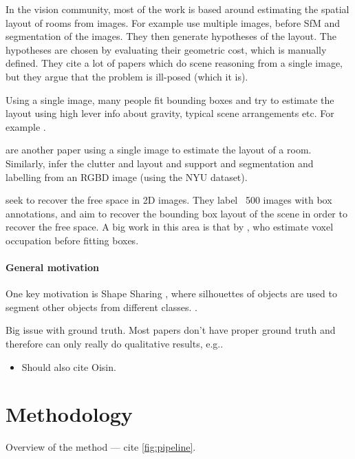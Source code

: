 \documentclass[10pt,a4paper]{article}
\makeatletter
\newcommand*{\eg}{e.g.\@\xspace}
\makeatother
\begin{document}
In the vision community, most of the work is based around estimating the spatial layout of rooms from images.
For example \cite{bao-wacv-2014} use multiple images, before SfM and segmentation of the images. 
They then generate hypotheses of the layout. 
The hypotheses are chosen by evaluating their geometric cost, which is manually defined. 
They cite a lot of papers which do scene reasoning from a single image, but they argue that the problem is ill-posed (which it is). 

Using a single image, many people fit bounding boxes and try to estimate the layout using high lever info about gravity, typical scene arrangements etc. 
For example \cite{choi-cvpr-2013}.

\cite{lee-nips-2010} are another paper using a single image to estimate the layout of a room. 
Similarly, \cite{zhang-iccv-2013} infer the clutter and layout and support and segmentation and labelling from an RGBD image (using the NYU dataset).

\cite{hedau-cvpr-2012} seek to recover the free space in 2D images. 
They label ~500 images with box annotations, and aim to recover the bounding box layout of the scene in order to recover the free space. 
A big work in this area is that by \cite{gupta-cvpr-2011}, who estimate voxel occupation before fitting boxes.


\paragraph{General motivation}
One key motivation is Shape Sharing \cite{kim-eccv-2012}, where silhouettes of objects are used to segment other objects from different classes.
 \cite{nan-acm-2012}.

Big issue with ground truth. Most papers don't have proper ground truth and therefore can only really do qualitative results, \eg \cite{all the papers...}.


\begin{itemize}
\item Should also cite Oisin.
\end{itemize}


\section{Methodology}

Overview of the method --- cite \ref{fig:pipeline}.
\end{document}
